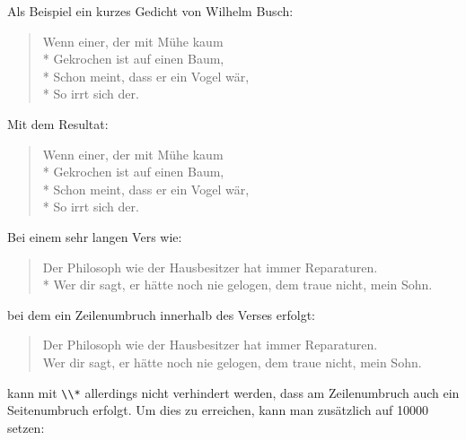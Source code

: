     \begin{Example}
      Als Beispiel ein kurzes Gedicht von Wilhelm Busch:
\begin{lstcode}
  \begin{verse}
    Wenn einer, der mit Mühe kaum\\*
    Gekrochen ist auf einen Baum,\\*
    Schon meint, dass er ein Vogel wär,\\*
    So irrt sich der.
  \end{verse}
\end{lstcode}
      Mit dem Resultat:
      \begin{ShowOutput}
        \begin{verse}
          Wenn einer, der mit Mühe kaum\\*
          Gekrochen ist auf einen Baum,\\*
          Schon meint, dass er ein Vogel wär,\\*
          So irrt sich der.
        \end{verse}
      \end{ShowOutput}
      Bei einem sehr langen Vers wie:
\begin{lstcode}
  \begin{verse}
    Der Philosoph wie der Hausbesitzer hat
    immer Reparaturen.\\*
    \bigskip
    Wer dir sagt, er hätte noch nie gelogen,
    dem traue nicht, mein Sohn.
  \end{verse}
\end{lstcode}
      bei dem ein Zeilenumbruch innerhalb des Verses erfolgt:
      \begin{ShowOutput}
        \begin{verse}
          Der Philosoph wie der Hausbesitzer hat immer Reparaturen.\\
          \bigskip
          Wer dir sagt, er hätte noch nie gelogen, dem traue nicht, mein
          Sohn.
        \end{verse}
      \end{ShowOutput}
      kann mit \verb|\\*| allerdings nicht verhindert werden, dass am
      Zeilenumbruch auch ein Seitenumbruch erfolgt. Um dies zu erreichen, kann
      man zusätzlich  auf
      10000 setzen:
\begin{lstcode}

\end{lstcode}
\end{Example}
